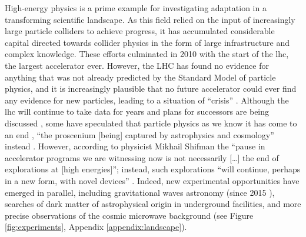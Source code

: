 \documentclass{article}
\begin{document}
High-energy physics is a prime example for investigating adaptation in a transforming scientific landscape. As this field relied on the input of increasingly large particle colliders to achieve progress, it has accumulated considerable capital directed towards collider physics in the form of large infrastructure and complex knowledge. These efforts culminated in 2010 with the start of the \gls{lhc}, the largest accelerator ever. However, the LHC has found no evidence for anything that was not already predicted by the Standard Model of particle physics, and it is increasingly plausible that no future accelerator could ever find any evidence for new particles, leading to a situation of ``crisis'' \citep{susy_crisis}. Although the \gls{lhc} will continue to take data for years and plans for successors are being discussed \citep{Roser2023}, some have speculated that particle physics as we know it has come to an end \citep{Harlander2023,Kosyakov2023}%
, ``the proscenium
[being] captured by astrophysics and cosmology'' instead \citep{Kosyakov2023}. However, according to physicist Mikhail Shifman the ``pause in accelerator programs we are witnessing now is not necessarily [\dots] the end of explorations at [high energies]''; instead, such explorations ``will continue, perhaps in a new form, with novel devices'' \citep{Shifman2020}. Indeed, new experimental opportunities have emerged in parallel, including gravitational waves astronomy (since 2015 \citep{Abbott2016}), searches of dark matter of astrophysical origin in underground facilities, and more precise observations of the cosmic microwave background (see Figure \ref{fig:experiments}, Appendix \ref{appendix:landscape}). %
\end{document}
